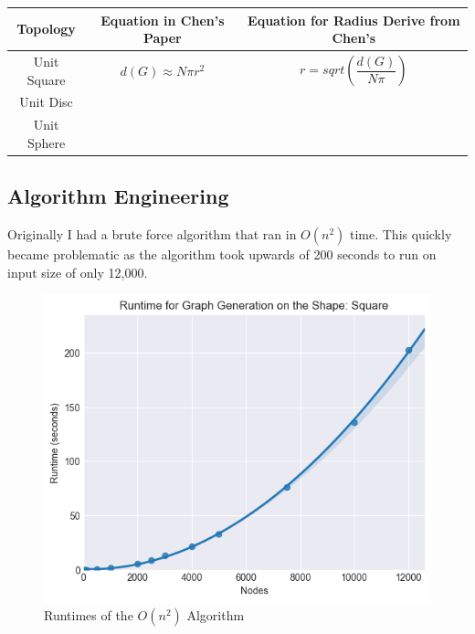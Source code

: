 \documentclass{article}
\begin{document}
    \begin{tabular}{ |c|c|c| }
  	  \hline
  	  Topology & Equation in Chen's Paper & Equation for Radius Derive from Chen's \\
  	  \hline
  	  Unit Square & $d(G) \approx N\pi r^2 $ & $r = sqrt(\dfrac{d(G)}{N\pi})$ \\
  	  \hline
  	  Unit Disc   & & \\
  	  \hline
  	  Unit Sphere & & \\
  	  \hline
    \end{tabular}

	  \subsection{Algorithm Engineering}
	  Originally I had a brute force algorithm that ran in $O(n^2)$ time.
	  This quickly became problematic as the algorithm took upwards of 200 seconds to run on input size of only 12,000.
	  \begin{figure}[H]
		\centering
		\includegraphics[width=1 \textwidth]{square/runtime/runtime_chart_naive}
		\caption{Runtimes of the $O(n^2)$ Algorithm}
	  \end{figure}
\end{document}
